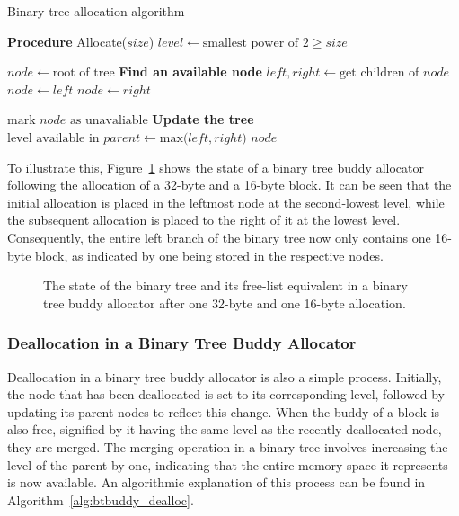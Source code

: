\begin{algorithm}
  \caption{Binary tree allocation algorithm}
  \label{alg:btbuddy_alloc}
  \begin{algorithmic}[1]
    \Statex \textbf{Procedure} Allocate($size$)
    \State $level \gets \text{smallest power of 2} \geq size$

    \State $node \gets \text{root of tree}$
    \Statex \textbf{Find an available node}
    \State $left, right \gets \text{get children of } node$
    \State $node \gets left$
    \Else
    \State $node \gets right$
    \EndIf
    \EndWhile

    \State \Return {}
    \EndIf

    \State $\text{mark } node \text{ as unavaliable}$
    \Statex \textbf{Update the tree}
    \State $\text{level available in } parent \gets \text{max(}left,right\text{)}$
    \EndFor
    \State \Return $node$
  \end{algorithmic}
\end{algorithm}

To illustrate this, Figure~\ref{fig:btbudydallocated} shows the state of a binary tree buddy allocator following the allocation of a 32-byte and a 16-byte block. It can be seen that the initial allocation is placed in the leftmost node at the second-lowest level, while the subsequent allocation is placed to the right of it at the lowest level. Consequently, the entire left branch of the binary tree now only contains one 16-byte block, as indicated by one being stored in the respective nodes.

\begin{figure}[h]
  \centering
  
  \caption{The state of the binary tree and its free-list equivalent in a binary tree buddy allocator after one 32-byte and one 16-byte allocation.}
  \label{fig:btbudydallocated}
\end{figure}

\subsubsection{Deallocation in a Binary Tree Buddy Allocator}
Deallocation in a binary tree buddy allocator is also a simple process. Initially, the node that has been deallocated is set to its corresponding level, followed by updating its parent nodes to reflect this change. When the buddy of a block is also free, signified by it having the same level as the recently deallocated node, they are merged. The merging operation in a binary tree involves increasing the level of the parent by one, indicating that the entire memory space it represents is now available. An algorithmic explanation of this process can be found in Algorithm~\ref{alg:btbuddy_dealloc}.

